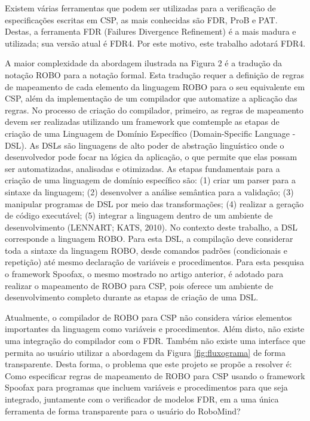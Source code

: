 Existem várias ferramentas que podem ser utilizadas para a verificação de especificações escritas em CSP, as mais conhecidas são FDR, ProB e PAT. Destas, a ferramenta FDR (Failures Divergence Refinement) é a mais madura e utilizada; sua versão atual é FDR4. Por este motivo, este trabalho adotará FDR4.

A maior complexidade da abordagem ilustrada na Figura 2 é a tradução da notação ROBO para a notação formal. Esta tradução requer a definição de regras de mapeamento de cada elemento da linguagem ROBO para o seu equivalente em CSP, além da implementação de um compilador que automatize a aplicação das regras. No processo de criação do compilador, primeiro, as regras de mapeamento devem ser realizadas utilizando um framework que comtemple as etapas de criação de uma Linguagem de Domínio Específico (Domain-Specific Language - DSL). As DSLs são linguagens de alto poder de abstração linguístico onde o desenvolvedor pode focar na lógica da aplicação, o que permite que elas possam ser automatizadas, analisadas e otimizadas. As etapas fundamentais para a criação de uma linguagem de domínio específico são: (1) criar um parser para a sintaxe da linguagem; (2) desenvolver a análise semântica para a validação; (3) manipular programas de DSL por meio das transformações; (4) realizar a geração de código executável; (5) integrar a linguagem dentro de um ambiente de desenvolvimento (LENNART; KATS, 2010). No contexto deste trabalho, a DSL corresponde a linguagem ROBO. Para esta DSL, a compilação deve considerar toda a sintaxe da linguagem ROBO, desde comandos padrões (condicionais e repetição) até mesmo declaração de variáveis e procedimentos. Para esta pesquisa o framework Spoofax, o mesmo mostrado no artigo anterior, é adotado para realizar o mapeamento de ROBO para CSP, pois oferece um ambiente de desenvolvimento completo durante as etapas de criação de uma DSL.

Atualmente, o compilador de ROBO para CSP não considera vários elementos importantes da linguagem como variáveis e procedimentos. Além disto, não existe uma integração do compilador com o FDR. Também não existe uma interface que permita ao usuário utilizar a abordagem da Figura \ref{fig:fluxograma} de forma transparente. Desta forma, o problema que este projeto se propõe a resolver é:
Como especificar regras de mapeamento de ROBO para CSP usando o framework Spoofax para programas que incluem variáveis e procedimentos para que seja integrado, juntamente com o verificador de modelos FDR, em a uma única ferramenta de forma transparente para o usuário do RoboMind?

